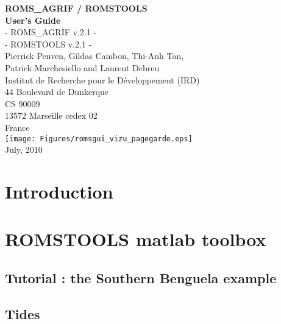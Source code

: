\documentclass[11pt]{book}
\begin{document}
\thispagestyle{empty}
\pagestyle{plain}
\begin{center}
\vspace{3 cm}
{\huge \bf ROMS\_AGRIF / ROMSTOOLS}\\
\vspace{0.5 cm}
{\huge \bf User's Guide }\\
\vspace{1.0cm}
{\large - ROMS\_AGRIF v.2.1 -} \\
{\large - ROMSTOOLS v.2.1 -} \\
\vspace{0.5 cm}
{\Large Pierrick Penven, Gildas Cambon, Thi-Anh Tan,  \\ 
Patrick Marchesiello and Laurent Debreu}\\ 
\vspace{1 cm}
{\Large Institut de Recherche pour le D\'eveloppement (IRD)}\\
\vspace{0.5 cm}
{\large 44 Boulevard de Dunkerque} \\
{\large CS 90009} \\
{\large 13572 Marseille cedex 02} \\
{\Large France} \\
\vspace{1.5cm}
\texttt{[image: Figures/romsgui\_vizu\_pagegarde.eps]}
\vspace{1cm} \\
{July, 2010}
\end{center}
\chapter*{Introduction}

\newpage
\tableofcontents
\newpage
\chapter{ROMSTOOLS matlab toolbox}



\section{Tutorial : the Southern Benguela example}


\section{Tides}

\end{document}
